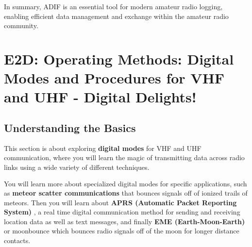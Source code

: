 In summary, ADIF is an essential tool for modern amateur radio logging, enabling efficient data management and exchange within the amateur radio community.




\section{E2D: Operating Methods: Digital Modes and Procedures for VHF and UHF - Digital Delights!}
\subsection*{Understanding the Basics}
This section is about exploring \textcolor{myblue}{\textbf{digital modes}} for VHF and UHF communication, where you will learn the magic of transmitting data across radio links using a wide variety of different techniques.
\par
   You will learn more about specialized digital modes for specific applications, such as  \textcolor{myblue}{\textbf{meteor scatter communications}} that bounces signals off of ionized trails of meteors. Then you will learn about \textcolor{myblue}{\textbf{APRS (Automatic Packet Reporting System)}} ,  a real time digital communication method for sending and receiving location data as well as text messages, and finally \textcolor{myblue}{\textbf{EME (Earth-Moon-Earth)} or moonbounce} which bounces radio signals off of the moon for longer distance contacts.


